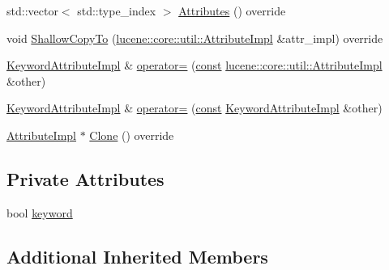 \begin{DoxyCompactItemize}
\item 
std\+::vector$<$ std\+::type\+\_\+index $>$ \mbox{\hyperlink{classlucene_1_1core_1_1analysis_1_1tokenattributes_1_1KeywordAttributeImpl_af338dde5485b5feb1b467fc07534f5cc}{Attributes}} () override
\item 
void \mbox{\hyperlink{classlucene_1_1core_1_1analysis_1_1tokenattributes_1_1KeywordAttributeImpl_a83f442881b35bc26a6edb2e04beeb58a}{Shallow\+Copy\+To}} (\mbox{\hyperlink{classlucene_1_1core_1_1util_1_1AttributeImpl}{lucene\+::core\+::util\+::\+Attribute\+Impl}} \&attr\+\_\+impl) override
\item 
\mbox{\hyperlink{classlucene_1_1core_1_1analysis_1_1tokenattributes_1_1KeywordAttributeImpl}{Keyword\+Attribute\+Impl}} \& \mbox{\hyperlink{classlucene_1_1core_1_1analysis_1_1tokenattributes_1_1KeywordAttributeImpl_a30228ce41cc678c1cb85c2fb1179f447}{operator=}} (\mbox{\hyperlink{ZlibCrc32_8h_a2c212835823e3c54a8ab6d95c652660e}{const}} \mbox{\hyperlink{classlucene_1_1core_1_1util_1_1AttributeImpl}{lucene\+::core\+::util\+::\+Attribute\+Impl}} \&other)
\item 
\mbox{\hyperlink{classlucene_1_1core_1_1analysis_1_1tokenattributes_1_1KeywordAttributeImpl}{Keyword\+Attribute\+Impl}} \& \mbox{\hyperlink{classlucene_1_1core_1_1analysis_1_1tokenattributes_1_1KeywordAttributeImpl_a26caf7be7512728452c2a5496788c39c}{operator=}} (\mbox{\hyperlink{ZlibCrc32_8h_a2c212835823e3c54a8ab6d95c652660e}{const}} \mbox{\hyperlink{classlucene_1_1core_1_1analysis_1_1tokenattributes_1_1KeywordAttributeImpl}{Keyword\+Attribute\+Impl}} \&other)
\item 
\mbox{\hyperlink{classlucene_1_1core_1_1util_1_1AttributeImpl}{Attribute\+Impl}} $\ast$ \mbox{\hyperlink{classlucene_1_1core_1_1analysis_1_1tokenattributes_1_1KeywordAttributeImpl_a59d16bdfa3c456ebcd8b3ae90279cd7b}{Clone}} () override
\end{DoxyCompactItemize}
\subsection*{Private Attributes}
\begin{DoxyCompactItemize}
\item 
bool \mbox{\hyperlink{classlucene_1_1core_1_1analysis_1_1tokenattributes_1_1KeywordAttributeImpl_a126e0c7f8c8c863cc2600f89ebade88d}{keyword}}
\end{DoxyCompactItemize}
\subsection*{Additional Inherited Members}


